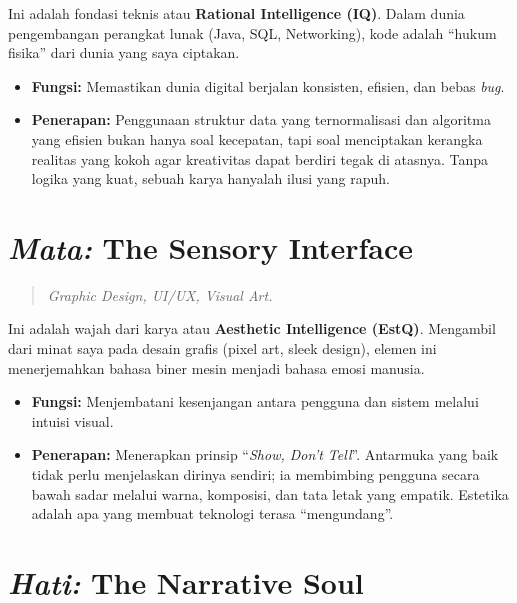 \documentclass[
  letterpaper,
  DIV=11,
  numbers=noendperiod]{scrreprt}
\providecommand{\tightlist}{%
  \setlength{\itemsep}{0pt}\setlength{\parskip}{0pt}}
\begin{document}
Ini adalah fondasi teknis atau \textbf{Rational Intelligence (IQ)}.
Dalam dunia pengembangan perangkat lunak (Java, SQL, Networking), kode
adalah ``hukum fisika'' dari dunia yang saya ciptakan.

\begin{itemize}
\tightlist
\item
  \textbf{Fungsi:} Memastikan dunia digital berjalan konsisten, efisien,
  dan bebas \emph{bug}.
\item
  \textbf{Penerapan:} Penggunaan struktur data yang ternormalisasi dan
  algoritma yang efisien bukan hanya soal kecepatan, tapi soal
  menciptakan kerangka realitas yang kokoh agar kreativitas dapat
  berdiri tegak di atasnya. Tanpa logika yang kuat, sebuah karya
  hanyalah ilusi yang rapuh.
\end{itemize}

\section{\texorpdfstring{\emph{Mata:} The Sensory
Interface}{Mata: The Sensory Interface}}\label{mata-the-sensory-interface}

\begin{quote}
\emph{Graphic Design, UI/UX, Visual Art.}
\end{quote}

Ini adalah wajah dari karya atau \textbf{Aesthetic Intelligence (EstQ)}.
Mengambil dari minat saya pada desain grafis (pixel art, sleek design),
elemen ini menerjemahkan bahasa biner mesin menjadi bahasa emosi
manusia.

\begin{itemize}
\tightlist
\item
  \textbf{Fungsi:} Menjembatani kesenjangan antara pengguna dan sistem
  melalui intuisi visual.
\item
  \textbf{Penerapan:} Menerapkan prinsip ``\emph{Show, Don't Tell}''.
  Antarmuka yang baik tidak perlu menjelaskan dirinya sendiri; ia
  membimbing pengguna secara bawah sadar melalui warna, komposisi, dan
  tata letak yang empatik. Estetika adalah apa yang membuat teknologi
  terasa ``mengundang''.
\end{itemize}

\section{\texorpdfstring{\emph{Hati:} The Narrative
Soul}{Hati: The Narrative Soul}}\label{hati-the-narrative-soul}
\end{document}
